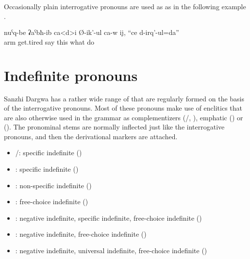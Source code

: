 Occasionally plain interrogative pronouns are used as  as in the following example .
%
\begin{exe}
	\ex	\label{ex:He says, my hands got tired, I do something}
	\gll	nuˁq-be	ʡaˁbħ-ib ca<d>i	Ø-ik'-ul ca-w	ij,	``ce	d-irq'-ul=da''\\
		arm	get.tired 	say 	this	what	do\\
	\glt	{}
\end{exe}



\section{Indefinite pronouns}
\label{sec:Indefinite pronouns}

Sanzhi Dargwa has a rather wide range of  that are regularly formed on the basis of the interrogative pronouns. Most of these pronouns make use of enclitics that are also otherwise used in the grammar as complementizers (\slash{}, ), emphatic  () or  (). The pronominal stems are normally inflected just like the interrogative pronouns, and then the derivational markers are attached.
%
\begin{itemize}
	\item	{}\slash{}: specific indefinite ()
		\item	{}: specific indefinite ()
	\item	{}: non-specific indefinite ()
	\item	{}: free-choice indefinite ()
	\item	{}: negative indefinite, specific indefinite, free-choice indefinite ()
		\item	{}: negative indefinite, free-choice indefinite ()
	\item	{}: negative indefinite, universal indefinite, free-choice indefinite ()
\end{itemize}

